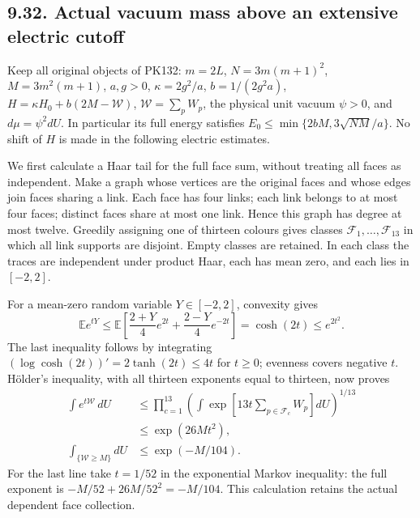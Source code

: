 \documentclass[11pt]{article}
\begin{document}
\subsection*{9.32. Actual vacuum mass above an extensive electric cutoff}

Keep all original objects of PK132: \(m=2L\), \(N=3m(m+1)^2\),
\(M=3m^2(m+1)\), \(a,g>0\), \(\kappa=2g^2/a\),
\(b=1/(2g^2a)\), \(H=\kappa H_0+b(2M-\mathcal W)\),
\(\mathcal W=\sum_pW_p\), the physical unit vacuum \(\psi>0\),
and \(d\mu=\psi^2dU\). In particular its full energy satisfies
\(E_0\le\min\{2bM,3\sqrt{NM}/a\}\). No shift of \(H\) is made
in the following electric estimates.

We first calculate a Haar tail for the full face sum, without treating
all faces as independent. Make a graph whose vertices are the original
faces and whose edges join faces sharing a link. Each face has four
links; each link belongs to at most four faces; distinct faces share
at most one link. Hence this graph has degree at most twelve.
Greedily assigning one of thirteen colours gives classes
\(\mathcal F_1,\ldots,\mathcal F_{13}\) in which all link supports
are disjoint. Empty classes are retained. In each class the traces
are independent under product Haar, each has mean zero, and each
lies in \([-2,2]\).

For a mean-zero random variable \(Y\in[-2,2]\), convexity gives
\[
 \mathbb E e^{tY}\le
 \mathbb E\left[\frac{2+Y}{4}e^{2t}
                    +\frac{2-Y}{4}e^{-2t}\right]
 =\cosh(2t)\le e^{2t^2}.
\]
The last inequality follows by integrating
\((\log\cosh(2t))'=2\tanh(2t)\le4t\) for \(t\ge0\);
evenness covers negative \(t\). Hölder's inequality, with all
thirteen exponents equal to thirteen, now proves
\[
 \begin{split}
 \int e^{t\mathcal W}\,dU
 &\le\prod_{c=1}^{13}
   \left(\int\exp\left[13t\sum_{p\in\mathcal F_c}W_p\right]dU
                                                    \right)^{1/13}\\
 &\le\exp(26Mt^2),\\
 \int_{\{\mathcal W\ge M\}}dU
 &\le \exp(-M/104).
 \end{split}\tag{PK207}
\]
For the last line take \(t=1/52\) in the exponential Markov
inequality: the full exponent is \(-M/52+26M/52^2=-M/104\).
This calculation retains the actual dependent face collection.
\end{document}
